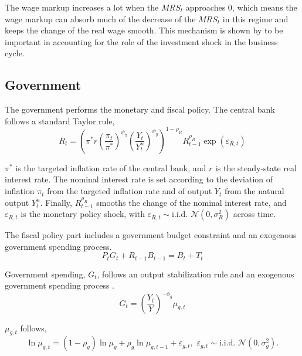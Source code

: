     The wage markup increases a lot when the $MRS_t$ approaches $0$, which means the wage markup can absorb much of the decrease of the $MRS_t$ in this regime and keeps the change of the real wage smooth. This mechanism is shown by \cite{justinianoInvestmentShocksBusiness2010} to be important in accounting for the role of the investment shock in the business cycle.

    \subsection{Government}
    The government performs the monetary and fiscal policy. The central bank follows a standard Taylor rule,
    \begin{equation}
        R_t = \left(\pi^* r \left(\frac{\pi_t}{\pi^*}\right)^{\psi_{\pi}} \left(\frac{Y_t}{Y_t^{n}}\right)^{\psi_y}\right)^{1 - \rho_R} R_{t-1}^{\rho_R}\exp(\varepsilon_{R,t})
    \end{equation}

    $\pi^*$ is the targeted inflation rate of the central bank, and $r$ is the steady-state real interest rate. The nominal interest rate is set according to the deviation of inflation $\pi_t$ from the targeted inflation rate and of output $Y_t$ from the natural output $Y^n_t$. Finally, $R^{\rho_R}_{t-1}$ smooths the change of the nominal interest rate, and $\varepsilon_{R,t}$ is the monetary policy shock, with $\varepsilon_{R,t} \sim \text{i.i.d. } \mathcal{N}(0, \sigma_R^2)$ across time.

    The fiscal policy part includes a government budget constraint and an exogenous government spending process.
    \begin{equation}
            P_t G_t + R_{t-1} B_{t-1} = B_t + T_t
    \end{equation}
    
    Government spending, $G_t$, follows an output stabilization rule and an exogenous government spending process \citep{leeperDynamicsFiscalFinancing2010}.
    \begin{equation}
        G_t = \left(\frac{Y_t}{Y}\right)^{-\phi_g} \mu_{g, t}
    \end{equation}

    $\mu_{g, t}$ follows,
    \begin{equation}
        \ln \mu_{g, t} = (1 - \rho_g) \ln \mu_{g} + \rho_{g}\ln\mu_{g, t-1} + \varepsilon_{g, t}, \,\, \varepsilon_{g, t} \sim \text{i.i.d. } \mathcal{N}(0, \sigma_g^2).
    \end{equation}

